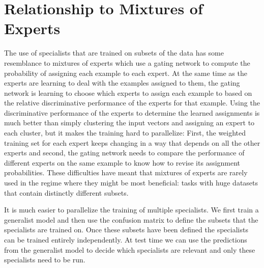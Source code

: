 \section{Relationship to Mixtures of Experts}

The use of specialists that are trained on subsets of the data has
some resemblance to mixtures of experts \cite{Jacobs} which use a
gating network to compute the probability of assigning each example to
each expert. At the same time as the experts are learning to deal with
the examples assigned to them, the gating network is learning to
choose which experts to assign each example to based on the relative
discriminative performance of the experts for that example.  Using the discriminative
performance of the experts to determine the learned assignments is much
better than simply clustering the input vectors and assigning an
expert to each cluster, but it makes the training hard to parallelize: First, the
weighted training set for each expert keeps changing in a way that
depends on all the other experts and second, the gating network needs
to compare the performance of different experts on the same example to
know how to revise its assignment probabilities.  These difficulties
have meant that mixtures of experts are rarely used in the regime
where they might be most beneficial: tasks with huge datasets that
contain distinctly different subsets.

It is much easier to parallelize the training of multiple specialists.
We first train a generalist model and then use the confusion matrix to
define the subsets that the specialists are trained on.  Once these
subsets have been defined the specialists can be trained entirely
independently.  At test time we can use the predictions from the
generalist model to decide which specialists are relevant and only
these specialists need to be run.


